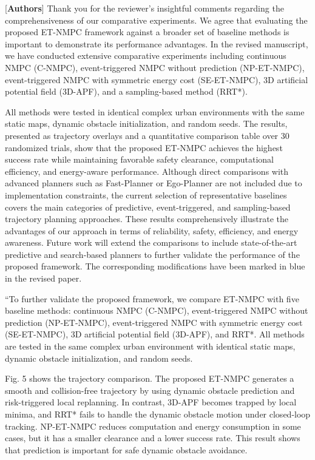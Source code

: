 \documentclass[12pt, twosides]{article}
\theoremstyle{definition}
\begin{document}
{\textcolor[rgb]{0.00,0.00,1.00}{[\textbf{Authors}]} Thank you for the reviewer's insightful comments regarding the comprehensiveness of our comparative experiments. We agree that evaluating the proposed ET-NMPC framework against a broader set of baseline methods is important to demonstrate its performance advantages. In the revised manuscript, we have conducted extensive comparative experiments including continuous NMPC (C-NMPC), event-triggered NMPC without prediction (NP-ET-NMPC), event-triggered NMPC with symmetric energy cost (SE-ET-NMPC), 3D artificial potential field (3D-APF), and a sampling-based method (RRT*). 

All methods were tested in identical complex urban environments with the same static maps, dynamic obstacle initialization, and random seeds. The results, presented as trajectory overlays and a quantitative comparison table over 30 randomized trials, show that the proposed ET-NMPC achieves the highest success rate while maintaining favorable safety clearance, computational efficiency, and energy-aware performance. Although direct comparisons with advanced planners such as Fast-Planner or Ego-Planner are not included due to implementation constraints, the current selection of representative baselines covers the main categories of predictive, event-triggered, and sampling-based trajectory planning approaches. These results comprehensively illustrate the advantages of our approach in terms of reliability, safety, efficiency, and energy awareness. Future work will extend the comparisons to include state-of-the-art predictive and search-based planners to further validate the performance of the proposed framework. The corresponding modifications have been marked in blue in the revised paper.


``To further validate the proposed framework, we compare ET-NMPC with five baseline methods: continuous NMPC (C-NMPC), event-triggered NMPC without prediction (NP-ET-NMPC), event-triggered NMPC with symmetric energy cost (SE-ET-NMPC), 3D artificial potential field (3D-APF), and RRT*. All methods are tested in the same complex urban environment with identical static maps, dynamic obstacle initialization, and random seeds.

Fig. 5 shows the trajectory comparison. The proposed ET-NMPC generates a smooth and collision-free trajectory by using dynamic obstacle prediction and risk-triggered local replanning. In contrast, 3D-APF becomes trapped by local minima, and RRT* fails to handle the dynamic obstacle motion under closed-loop tracking. NP-ET-NMPC reduces computation and energy consumption in some cases, but it has a smaller clearance and a lower success rate. This result shows that prediction is important for safe dynamic obstacle avoidance.

}
\end{document}

